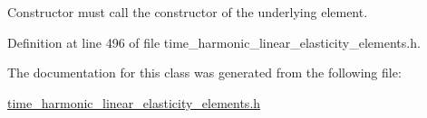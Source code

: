 Constructor must call the constructor of the underlying element. 



Definition at line 496 of file time\+\_\+harmonic\+\_\+linear\+\_\+elasticity\+\_\+elements.\+h.



The documentation for this class was generated from the following file\+:\begin{DoxyCompactItemize}
\item 
\hyperlink{time__harmonic__linear__elasticity__elements_8h}{time\+\_\+harmonic\+\_\+linear\+\_\+elasticity\+\_\+elements.\+h}\end{DoxyCompactItemize}
